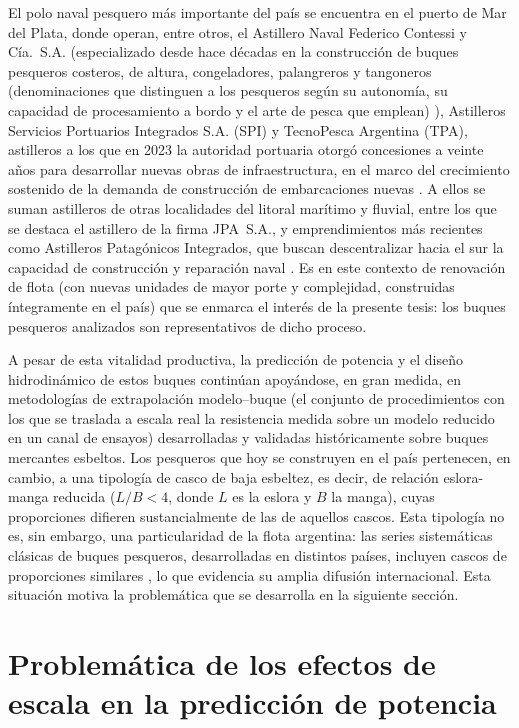 El polo naval pesquero más importante del país se encuentra en el puerto de
Mar del Plata, donde operan, entre otros, el Astillero Naval Federico
Contessi y Cía.\ S.A. (especializado desde hace décadas en la construcción de
buques pesqueros costeros, de altura, congeladores, palangreros y
tangoneros (denominaciones que distinguen a los pesqueros según su autonomía,
su capacidad de procesamiento a bordo y el arte de pesca que emplean)
\citep{contessi_historia}), Astilleros Servicios Portuarios Integrados S.A.
(SPI) y TecnoPesca Argentina (TPA), astilleros a los que en 2023 la autoridad
portuaria otorgó concesiones a veinte años para desarrollar nuevas obras de
infraestructura, en el marco del crecimiento sostenido de la demanda de
construcción de embarcaciones nuevas \citep{globalports_concesiones_mdp}. A
ellos se suman astilleros de otras localidades del litoral marítimo y
fluvial, entre los que se destaca el astillero de la firma JPA~S.A., y
emprendimientos más recientes como Astilleros Patagónicos Integrados, que
buscan descentralizar hacia el sur la capacidad de construcción y reparación
naval \citep{pescare_api_patagonia}. Es en este contexto de renovación de
flota (con nuevas unidades de mayor porte y complejidad, construidas
íntegramente en el país) que se enmarca el interés de la presente tesis: los
buques pesqueros analizados son representativos de dicho proceso.

A pesar de esta vitalidad productiva, la predicción de potencia y el diseño
hidrodinámico de estos buques continúan apoyándose, en gran medida, en
metodologías de extrapolación modelo--buque (el conjunto de procedimientos
con los que se traslada a escala real la resistencia medida sobre un modelo
reducido en un canal de ensayos) desarrolladas y validadas históricamente
sobre buques mercantes esbeltos. Los pesqueros que hoy se
construyen en el país pertenecen, en cambio, a una tipología de casco de baja
esbeltez, es decir, de relación eslora-manga reducida ($L/B < 4$, donde $L$ es
la eslora y $B$ la manga), cuyas proporciones difieren sustancialmente de las
de aquellos cascos. Esta tipología no es, sin embargo, una particularidad de
la flota argentina: las series sistemáticas clásicas de buques pesqueros,
desarrolladas en distintos países, incluyen cascos de proporciones similares
\citep{yilmaz1999}, lo que evidencia su amplia difusión internacional. Esta
situación motiva la problemática que se desarrolla en la siguiente sección.

\section{Problemática de los efectos de escala en la predicción de potencia}
\label{sec:problematica}


